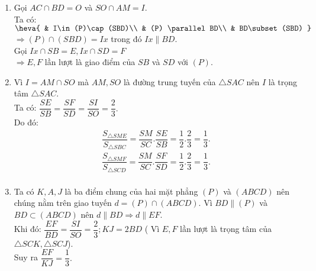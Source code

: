 \begin{vd}
{\begin{enumerate}
			\item Gọi $AC\cap BD=O$ và $SO\cap AM=I$.\\
			Ta có: $\heva{
				& I\in (P)\cap (SBD)\\
				& (P) \parallel BD\\
				& BD\subset (SBD)
			}$\\
			$\Rightarrow (P)\cap (SBD)=Ix$
			trong đó $Ix\parallel BD$.\\
			Gọi $Ix\cap SB=E, Ix\cap SD=F$\\
			$ \Rightarrow E, F$ lần lượt là giao điểm của $SB$ và $SD$ với $(P).$
			\item Vì $I=AM\cap SO$ mà $AM, SO$ là đường trung tuyến của $\triangle SAC$ nên $I$ là trọng tâm $\triangle SAC.$\\
			Ta có: $\dfrac{SE}{SB}=\dfrac{SF}{SD}=\dfrac{SI}{SO}=\dfrac{2}{3}.$\\
			Do đó:
			\begin{align*}
			\dfrac{S_{\triangle SME}}{S_{\triangle SBC}}
			=\dfrac{SM}{SC}.\dfrac{SE}{SB}=\dfrac{1}{2}.\dfrac{2}{3}=\dfrac{1}{3}.\\
			\dfrac{S_{\triangle SMF}}{S_{\triangle SCD}}
			=\dfrac{SM}{SC}.\dfrac{SF}{SD}=\dfrac{1}{2}.\dfrac{2}{3}=\dfrac{1}{3}.\\
			\end{align*}
			\item Ta có $K, A, J$ là ba điểm chung của hai mặt phẳng $(P)$ và $(ABCD)$ nên chúng nằm trên giao tuyến $d=(P)\cap (ABCD)$. Vì $BD\parallel (P)$ và $BD\subset (ABCD)$ nên $d\parallel BD\Rightarrow d\parallel EF$.\\
			Khi đó: $\dfrac{EF}{BD}=\dfrac{SI}{SO}=\dfrac{2}{3}; KJ=2BD$ ( Vì $E, F$ lần lượt là trọng tâm của $\triangle SCK, \triangle SCJ$).\\
			Suy ra $\dfrac{EF}{KJ}=\dfrac{1}{3}.$
		\end{enumerate}
	}
\end{vd}

